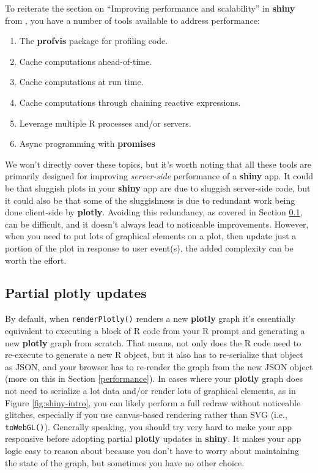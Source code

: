 \documentclass[
  12pt,
]{krantz}
\providecommand{\tightlist}{%
  \setlength{\itemsep}{0pt}\setlength{\parskip}{0pt}}
\begin{document}
To reiterate the section on ``Improving performance and scalability'' in \textbf{shiny} from \citet{async}, you have a number of tools available to address performance:

\begin{enumerate}
\def\labelenumi{\arabic{enumi}.}
\tightlist
\item
  The \textbf{profvis} package for profiling code.
\item
  Cache computations ahead-of-time.
\item
  Cache computations at run time.
\item
  Cache computations through chaining reactive expressions.
\item
  Leverage multiple R processes and/or servers.
\item
  Async programming with \textbf{promises}
\end{enumerate}

We won't directly cover these topics, but it's worth noting that all these tools are primarily designed for improving \emph{server-side} performance of a \textbf{shiny} app. It could be that sluggish plots in your \textbf{shiny} app are due to sluggish server-side code, but it could also be that some of the sluggishness is due to redundant work being done client-side by \textbf{plotly}. Avoiding this redundancy, as covered in Section \ref{proxies}, can be difficult, and it doesn't always lead to noticeable improvements. However, when you need to put lots of graphical elements on a plot, then update just a portion of the plot in response to user event(s), the added complexity can be worth the effort.

\hypertarget{proxies}{%
\subsection{Partial plotly updates}\label{proxies}}


By default, when \texttt{renderPlotly()} renders a new \textbf{plotly} graph it's essentially equivalent to executing a block of R code from your R prompt and generating a new \textbf{plotly} graph from scratch. That means, not only does the R code need to re-execute to generate a new R object, but it also has to re-serialize that object as JSON, and your browser has to re-render the graph from the new JSON object (more on this in Section \ref{performance}). In cases where your \textbf{plotly} graph does not need to serialize a lot data and/or render lots of graphical elements, as in Figure \ref{fig:shiny-intro}, you can likely perform a full redraw without noticeable glitches, especially if you use canvas-based rendering rather than SVG (i.e., \texttt{toWebGL()}). Generally speaking, you should try very hard to make your app responsive before adopting partial \textbf{plotly} updates in \textbf{shiny}. It makes your app logic easy to reason about because you don't have to worry about maintaining the state of the graph, but sometimes you have no other choice.
\end{document}
